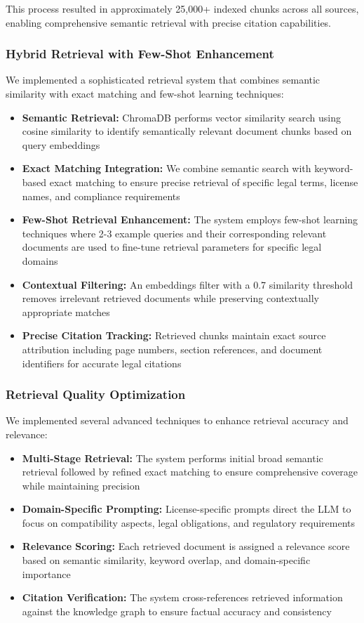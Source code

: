 This process resulted in approximately 25,000+ indexed chunks across all sources, enabling comprehensive semantic retrieval with precise citation capabilities.

\subsubsection{Hybrid Retrieval with Few-Shot Enhancement}
We implemented a sophisticated retrieval system that combines semantic similarity with exact matching and few-shot learning techniques:

\begin{itemize}
    \item \textbf{Semantic Retrieval:} ChromaDB performs vector similarity search using cosine similarity to identify semantically relevant document chunks based on query embeddings
    \item \textbf{Exact Matching Integration:} We combine semantic search with keyword-based exact matching to ensure precise retrieval of specific legal terms, license names, and compliance requirements
    \item \textbf{Few-Shot Retrieval Enhancement:} The system employs few-shot learning techniques where 2-3 example queries and their corresponding relevant documents are used to fine-tune retrieval parameters for specific legal domains
    \item \textbf{Contextual Filtering:} An embeddings filter with a 0.7 similarity threshold removes irrelevant retrieved documents while preserving contextually appropriate matches
    \item \textbf{Precise Citation Tracking:} Retrieved chunks maintain exact source attribution including page numbers, section references, and document identifiers for accurate legal citations
\end{itemize}

\subsubsection{Retrieval Quality Optimization}
We implemented several advanced techniques to enhance retrieval accuracy and relevance:

\begin{itemize}
    \item \textbf{Multi-Stage Retrieval:} The system performs initial broad semantic retrieval followed by refined exact matching to ensure comprehensive coverage while maintaining precision
    \item \textbf{Domain-Specific Prompting:} License-specific prompts direct the LLM to focus on compatibility aspects, legal obligations, and regulatory requirements
    \item \textbf{Relevance Scoring:} Each retrieved document is assigned a relevance score based on semantic similarity, keyword overlap, and domain-specific importance
    \item \textbf{Citation Verification:} The system cross-references retrieved information against the knowledge graph to ensure factual accuracy and consistency
\end{itemize}

